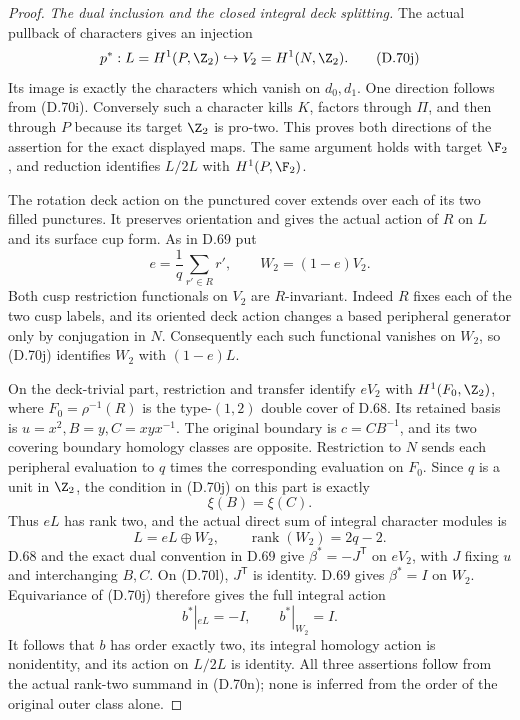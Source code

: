 \begin{proof}
\emph{The dual inclusion and the closed integral deck splitting.}
The actual pullback of characters gives an injection
\[
 p^*:L=H^1(P,\Z_2)\hookrightarrow
                     V_2=H^1(N,\Z_2).
                                                               \tag{D.70j}
\]
Its image is exactly the characters which vanish
on $d_0,d_1$.
One direction follows from (D.70i).
Conversely such a character kills $K$, factors
through $\Pi$, and then through $P$ because its
target $\Z_2$ is pro-two.
This proves both directions of the assertion
for the exact displayed maps.
The same argument holds with target $\F_2$,
and reduction identifies $L/2L$ with $H^1(P,\F_2)$.

The rotation deck action on the punctured cover
extends over each of its two filled punctures.
It preserves orientation and gives the actual
action of $R$ on $L$ and its surface cup form.
As in D.69 put
\[
 e=\frac1q\sum_{r'\in R}r',\qquad W_2=(1-e)V_2 .
                                                               \tag{D.70k}
\]
Both cusp restriction functionals on $V_2$
are $R$-invariant. Indeed $R$ fixes each of the
two cusp labels, and its oriented deck action
changes a based peripheral generator only by
conjugation in $N$.
Consequently each such functional vanishes on
$W_2$, so (D.70j) identifies $W_2$ with
$(1-e)L$.

On the deck-trivial part, restriction and transfer
identify $eV_2$ with $H^1(F_0,\Z_2)$, where
$F_0=\rho^{-1}(R)$ is the type-$(1,2)$ double cover
of D.68. Its retained basis is
$u=x^2,B=y,C=xyx^{-1}$.
The original boundary is $c=CB^{-1}$,
and its two covering boundary homology classes
are opposite.
Restriction to $N$ sends each peripheral evaluation
to $q$ times the corresponding evaluation on $F_0$.
Since $q$ is a unit in $\Z_2$, the condition in
(D.70j) on this part is exactly
\[
                              \xi(B)=\xi(C).
                                                               \tag{D.70l}
\]
Thus $eL$ has rank two, and the actual direct
sum of integral character modules is
\[
                  L=eL\oplus W_2,\qquad
             \operatorname{rank}(W_2)=2q-2 .
                                                               \tag{D.70m}
\]
D.68 and the exact dual convention in D.69 give
$\beta^*=-J^{\mathsf T}$ on $eV_2$, with $J$
fixing $u$ and interchanging $B,C$.
On (D.70l), $J^{\mathsf T}$ is identity.
D.69 gives $\beta^*=I$ on $W_2$.
Equivariance of (D.70j) therefore gives the
full integral action
\[
                  b^*|_{eL}=-I,\qquad b^*|_{W_2}=I.
                                                               \tag{D.70n}
\]
It follows that $b$ has order exactly two,
its integral homology action is nonidentity,
and its action on $L/2L$ is identity.
All three assertions follow from the actual
rank-two summand in (D.70n); none is inferred
from the order of the original outer class alone.


\end{proof}
